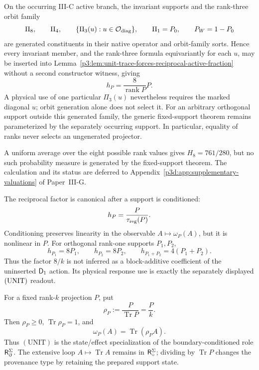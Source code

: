 \documentclass[12pt,a4paper]{article}
\begin{document}
\begin{corollary}
\label{p3d:cor:generated-active-support-inheritance}
On the occurring III-C active branch, the invariant supports and the
rank-three orbit family
\[
 \Pi_8,\qquad \Pi_4,\qquad
 \{\Pi_3(u):u\in\mathcal O_{\rm diag}\},\qquad \Pi_1=P_0,
 \qquad P_W=1-P_0
\]
are generated constituents in their native operator and orbit-family sorts.
Hence every invariant member, and the rank-three formula equivariantly for
each \(u\), may be
inserted into Lemma~\ref{p3:lem:unit-trace-forces-reciprocal-active-fraction}
without a second constructor witness, giving
\[
 h_P=\frac8{\operatorname{rank}P}P.
\]
A physical use of one particular \(\Pi_3(u)\) nevertheless requires the
marked diagonal \(u\); orbit generation alone does not select it.
For an arbitrary orthogonal support outside this generated family, the generic
fixed-support theorem remains parameterized by the separately occurring
support.  In particular, equality of ranks never selects an ungenerated
projector.
\end{corollary}

\begin{remark}
A uniform average over the eight possible rank values gives
\(H_8=761/280\), but no such probability measure is generated by the
fixed-support theorem.  The calculation and its status are deferred to
Appendix~\ref{p3d:app:supplementary-valuations} of Paper~III-G.
\end{remark}

\begin{remark}
\label{p3:rem:no-hidden-inverse-trace-axiom}
The reciprocal factor is canonical after a support is conditioned:
\[
 h_P=\frac{P}{\tau_{\rm reg}(P)}.
\]
Conditioning preserves linearity in the observable \(A\mapsto\omega_P(A)\),
but it is nonlinear in \(P\).  For orthogonal rank-one supports \(P_1,P_2\),
\[
 h_{P_1}=8P_1,\qquad h_{P_2}=8P_2,\qquad
 h_{P_1+P_2}=4(P_1+P_2).
\]
Thus the factor \(8/k\) is not inferred as a block-additive coefficient of
the uninserted \(\mathsf{D}_1\) action.  Its physical response use is exactly the
separately displayed \(({\rm UNIT})\) readout.
\end{remark}

\begin{corollary}
\label{p3d:cor:unit-boundary-normal-form}
For a fixed rank-\(k\) projection \(P\), put
\[
 \rho_P:=\frac{P}{\operatorname{Tr}P}=\frac{P}{k}.
\]
Then \(\rho_P\ge0\), \(\operatorname{Tr}\rho_P=1\), and
\[
 \boxed{\omega_P(A)=\operatorname{Tr}(\rho_P A).}
\]
Thus \((\mathrm{UNIT})\) is the state/effect specialization of the
boundary-conditioned role \(\mathsf R_{\partial}^{\Sigma}\).  The extensive loop
\(A\mapsto\operatorname{Tr}A\) remains in \(\mathsf R_{\circ}^{\Sigma}\); dividing by
\(\operatorname{Tr}P\) changes the provenance type by retaining the prepared
support state.
\end{corollary}
\end{document}
